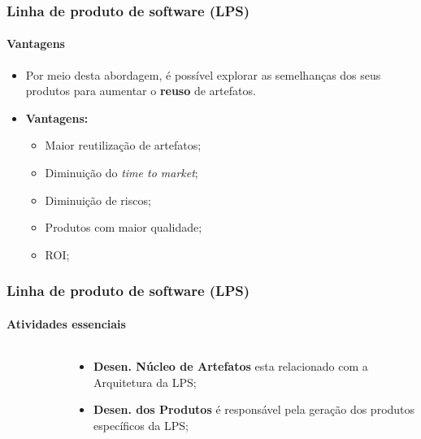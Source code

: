 \begin{frame}
\frametitle{Linha de produto de software (LPS)}
\framesubtitle{Vantagens}

\begin{itemize}
 \item {
   Por meio desta abordagem, é possível explorar as semelhanças dos seus produtos para aumentar o \textbf{reuso} de artefatos. 
 }
 \item {
   \textbf{Vantagens:}
   
   \begin{itemize}
     \item {
       Maior reutilização de artefatos;
     }
     \item {
      Diminuição do \textit{time to market};
    }
    \item {
      Diminuição de riscos;
    }
    \item {
      Produtos com maior qualidade;
    }
    \item {
      ROI;
    }
   \end{itemize}
   
 }
\end{itemize}

\end{frame}

\begin{frame}
\frametitle{Linha de produto de software (LPS)}
\framesubtitle{Atividades essenciais}

  \begin{columns}[onlytextwidth]
  
    \begin{column}{0.5\textwidth}
      \centering
      \begin{figure}
      \end{figure}
    \end{column}
    
    \begin{column}{0.5\textwidth}
      \begin{itemize}
        \item {
          \textbf{Desen. Núcleo de Artefatos} esta relacionado com a Arquitetura da LPS;
        }
        \item {
          \textbf{Desen. dos Produtos} é responsável pela geração dos produtos específicos da LPS;
        }
      \end{itemize}

    \end{column}
    
  \end{columns}

\end{frame}

